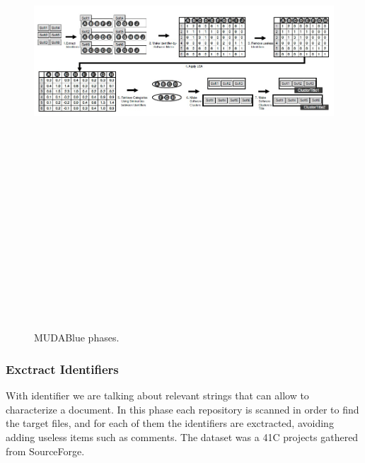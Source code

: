 \begin{figure}[H]
\includegraphics[width=15cm,height=20cm,keepaspectratio]{images/Mudablue1.png}
\centering
\caption{MUDABlue phases.}
\end{figure}

\subsubsection{Exctract Identifiers}
With identifier we are talking about relevant strings that can allow to characterize a document. In this phase each repository is scanned in order to find the target files, and for each of them the identifiers are exctracted, avoiding adding useless items such as comments. The dataset was a 41C projects gathered from SourceForge.

